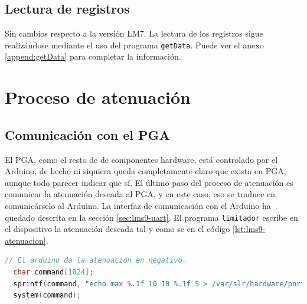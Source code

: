 \subsection{Lectura de registros}

Sin cambios respecto a la versión LM7. La lectura de los registros sigue realizándose mediante el uso del programa \verb|getData|. Puede ver el anexo \ref{append:getData} para completar la información.

\clearpage
\section{Proceso de atenuación}

\subsection{Comunicación con el PGA}

El PGA, como el resto de de componentes hardware, está controlado por el Arduino, de hecho ni siquiera queda completamente claro que exista en PGA, aunque todo parecer indicar que sí. El último paso del proceso de atenuación es comunicar la atenuación deseada al PGA, y en este caso, eso se traduce en comunicárselo al Arduino. La interfaz de comunicación con el Arduino ha quedado descrita en la sección \ref{sec:lms9-uart}. El programa \verb|limitador| escribe en el dispositivo la atenuación deseada tal y como se en el código \ref{lst:lms9-atenuacion}. \\

\begin{lstlisting}[language=c++, caption={Comunicación de la atenuación deseada en el LM9.}, label={lst:lms9-atenuacion}]
  // El arduino da la atenuación en negativo.
  char command[1024];
  sprintf(command, "echo max %.1f 10 10 %.1f 5 > /var/slr/hardware/port", -desiredAt, 0.0f);
  system(command);
\end{lstlisting}
